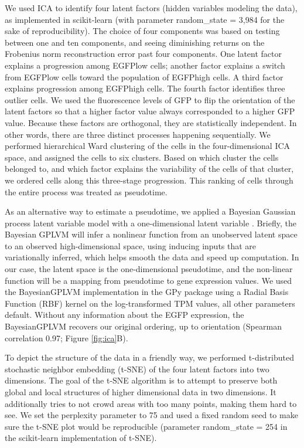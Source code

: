 We used ICA \cite{Hyvarinen2000-vi} to identify four latent factors (hidden variables modeling the data), as implemented in scikit-learn (with parameter random\_state = 3,984 for the sake of reproducibility). The choice of four components was based on testing between one and ten components, and seeing diminishing returns on the Frobenius norm reconstruction error past four components. One latent factor explains a progression among EGFPlow cells; another factor explains a switch from EGFPlow cells toward the population of EGFPhigh cells. A third factor explains progression among EGFPhigh cells. The fourth factor identifies three outlier cells. We used the fluorescence levels of GFP to flip the orientation of the latent factors so that a higher factor value always corresponded to a higher GFP value. Because these factors are orthogonal, they are statistically independent. In other words, there are three distinct processes happening sequentially. We performed hierarchical Ward clustering \cite{Ward1963-hr} of the cells in the four-dimensional ICA space, and assigned the cells to six clusters. Based on which cluster the cells belonged to, and which factor explains the variability of the cells of that cluster, we ordered cells along this three-stage progression. This ranking of cells through the entire process was treated as pseudotime.

As an alternative way to estimate a pseudotime, we applied a Bayesian Gaussian process latent variable model with a one-dimensional latent variable \cite{Titsias2010-hq}. Briefly, the Bayesian GPLVM will infer a nonlinear function from an unobserved latent space to an observed high-dimensional space, using inducing inputs that are variationally inferred, which helps smooth the data and speed up computation. In our case, the latent space is the one-dimensional pseudotime, and the non-linear function will be a mapping from pseudotime to gene expression values. We used the BayesianGPLVM implementation in the GPy package using a Radial Basis Function (RBF) kernel on the log-transformed TPM values, all other parameters default. Without any information about the EGFP expression, the BayesianGPLVM recovers our original ordering, up to orientation (Spearman correlation 0.97; Figure  \ref{fig:ica}B).

To depict the structure of the data in a friendly way, we performed t-distributed stochastic neighbor embedding (t-SNE) \cite{Van_der_Maaten2008-lh} of the four latent factors into two dimensions. The goal of the t-SNE algorithm is to attempt to preserve both global and local structures of higher dimensional data in two dimensions. It additionally tries to not crowd areas with too many points, making them hard to see. We set the perplexity parameter to 75 and used a fixed random seed to make sure the t-SNE plot would be reproducible (parameter random\_state = 254 in the scikit-learn implementation of t-SNE).

